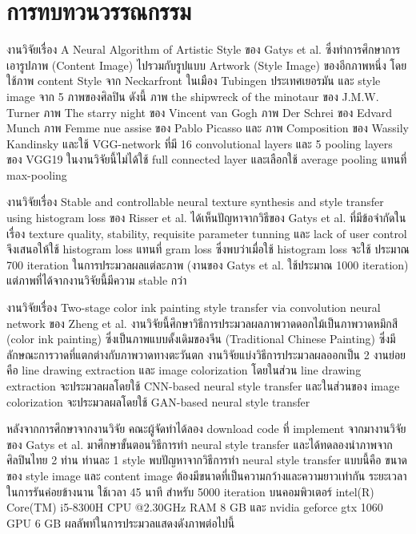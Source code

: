 \documentclass[12pt,oneside,openright,a4paper]{cpe-thai-project}
\begin{document}
\section{การทบทวนวรรณกรรม}
\par\setlength{\parindent}{5ex}
งานวิจัยเรื่อง A Neural Algorithm of Artistic Style ของ Gatys  et al.\cite{gatys2015neural} ซึ่งทำการศึกษาการเอารูปภาพ (Content Image) ไปรวมกับรูปแบบ Artwork (Style Image) ของอีกภาพหนึ่ง โดยใช้ภาพ content Style จาก Neckarfront ในเมือง Tubingen ประเทศเยอรมัน และ style image จาก 5 ภาพของศิลปิน ดังนี้ ภาพ the shipwreck of the minotaur ของ J.M.W. Turner ภาพ The starry night ของ Vincent van Gogh ภาพ Der Schrei ของ Edvard Munch ภาพ Femme nue assise ของ Pablo Picasso และ ภาพ Composition ของ Wassily Kandinsky  และใช้  VGG-network  ที่มี 16 convolutional layers และ 5 pooling layers ของ VGG19 ในงานวิจัยนี้ไม่ได้ใช้ full connected layer และเลือกใช้ average pooling แทนที่ max-pooling 
\par\setlength{\parindent}{5ex}
งานวิจัยเรื่อง Stable and controllable neural texture synthesis and style transfer using histogram loss ของ Risser et al. ได้เห็นปัญหาจากวิธีของ Gatys et al. ที่มีข้อจำกัดในเรื่อง texture quality, stability, requisite parameter tunning และ lack of user control จึงเสนอให้ใช้ histogram loss แทนที่ gram loss ซึ่งพบว่าเมื่อใช้ histogram loss จะใช้ ประมาณ 700 iteration ในการประมวลผลแต่ละภาพ  (งานของ Gatys et al. ใช้ประมาณ 1000 iteration) แต่ภาพที่ได้จากงานวิจัยนี้มีความ stable กว่า 
\par\setlength{\parindent}{5ex}
งานวิจัยเรื่อง Two-stage color ink painting style transfer via convolution neural network ของ Zheng et al.\cite{8636278} งานวิจัยนี้ศึกษาวิธีการประมวลผลภาพวาดดอกไม้เป็นภาพวาดหมึกสี (color ink painting) ซึ่งเป็นภาพแบบดั้งเดิมของจีน (Traditional Chinese Painting) ซึ่งมีลักษณะการวาดที่แตกต่างกับภาพวาดทางตะวันตก งานวิจัยแบ่งวิธีการประมวลผลออกเป็น 2 งานย่อย คือ line drawing extraction และ image colorization โดยในส่วน line drawing extraction จะประมวลผลโดยใช้ CNN-based neural style transfer และในส่วนของ image colorization จะประมวลผลโดยใช้ GAN-based neural style transfer
\par\setlength{\parindent}{5ex} %
หลังจากการศึกษาจากงานวิจัย คณะผู้จัดทำได้ลอง download code ที่ implement จากมางานวิจัยของ Gatys et al. \cite{NeuralTr45:online} มาศึกษาขั้นตอนวิธีการทำ neural style transfer และได้ทดลองนำภาพจากศิลปินไทย 2 ท่าน ท่านละ 1 style พบปัญหาจากวิธีการทำ neural style transfer แบบนี้คือ ขนาดของ style image และ content image ต้องมีขนาดที่เป็นความกว้างและความยาวเท่ากัน ระยะเวลาในการรันค่อยข้างนาน ใช้เวลา 45 นาที สำหรับ 5000 iteration บนคอมพิวเตอร์ intel(R) Core(TM) i5-8300H CPU @2.30GHz RAM 8 GB และ nvidia geforce gtx 1060 GPU 6 GB ผลลัพท์ในการประมวลแสดงดังภาพต่อไปนี้
\end{document}
